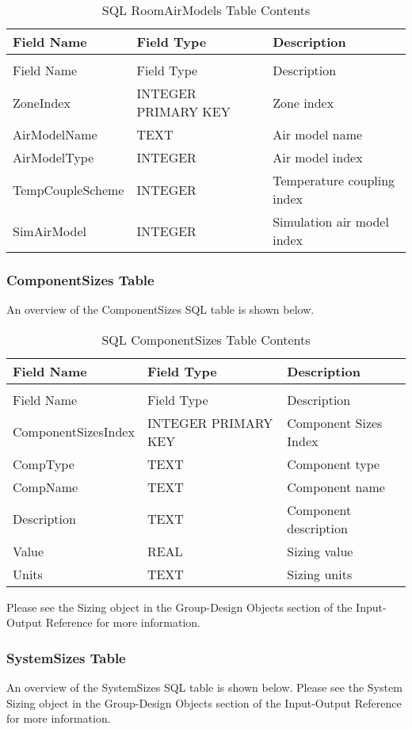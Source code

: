 \begin{longtable}[c]{@{}lll@{}}
\caption{SQL RoomAirModels Table Contents \label{table:table-29.-sql-roomairmodels-table-contents}} \tabularnewline
\toprule 
Field Name & Field Type & Description \tabularnewline
\midrule
\endfirsthead

\caption[]{SQL RoomAirModels Table Contents} \tabularnewline
\toprule 
Field Name & Field Type & Description \tabularnewline
\midrule
\endhead

ZoneIndex & INTEGER PRIMARY KEY & Zone index \tabularnewline
AirModelName & TEXT & Air model name \tabularnewline
AirModelType & INTEGER & Air model index \tabularnewline
TempCoupleScheme & INTEGER & Temperature coupling index \tabularnewline
SimAirModel & INTEGER & Simulation air model index \tabularnewline
\bottomrule
\end{longtable}

\subsubsection{ComponentSizes Table}

An overview of the ComponentSizes SQL table is shown below.

\begin{longtable}[c]{@{}lll@{}}
\caption{SQL ComponentSizes Table Contents \label{table:table-30.-sql-componentsizes-table-contents}} \tabularnewline
\toprule 
Field Name & Field Type & Description \tabularnewline
\midrule
\endfirsthead

\caption[]{SQL ComponentSizes Table Contents} \tabularnewline
\toprule 
Field Name & Field Type & Description \tabularnewline
\midrule
\endhead

ComponentSizesIndex & INTEGER PRIMARY KEY & Component Sizes Index \tabularnewline
CompType & TEXT & Component type \tabularnewline
CompName & TEXT & Component name \tabularnewline
Description & TEXT & Component description \tabularnewline
Value & REAL & Sizing value \tabularnewline
Units & TEXT & Sizing units \tabularnewline
\bottomrule
\end{longtable}

Please see the Sizing object in the Group-Design Objects section of the Input-Output Reference for more information.

\subsubsection{SystemSizes Table}

An overview of the SystemSizes SQL table is shown below. Please see the System Sizing object in the Group-Design Objects section of the Input-Output Reference for more information.

